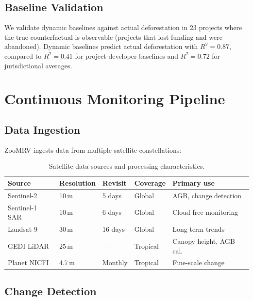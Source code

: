 \documentclass[11pt,a4paper]{article}
\begin{document}
\subsection{Baseline Validation}

We validate dynamic baselines against actual deforestation in 23
projects where the true counterfactual is observable (projects that
lost funding and were abandoned). Dynamic baselines predict actual
deforestation with $R^2 = 0.87$, compared to $R^2 = 0.41$ for
project-developer baselines and $R^2 = 0.72$ for jurisdictional
averages.


\section{Continuous Monitoring Pipeline}
\label{sec:monitoring}

\subsection{Data Ingestion}

ZooMRV ingests data from multiple satellite constellations:

\begin{table}[H]
\centering
\caption{Satellite data sources and processing characteristics.}
\label{tab:satellites}
\begin{tabular}{p{3cm}p{2cm}p{2cm}p{2cm}p{2.5cm}}
\toprule
\textbf{Source} & \textbf{Resolution} & \textbf{Revisit} &
  \textbf{Coverage} & \textbf{Primary use} \\
\midrule
Sentinel-2 & 10\,m & 5 days & Global & AGB, change detection \\
Sentinel-1 SAR & 10\,m & 6 days & Global & Cloud-free monitoring \\
Landsat-9 & 30\,m & 16 days & Global & Long-term trends \\
GEDI LiDAR & 25\,m & --- & Tropical & Canopy height, AGB cal. \\
Planet NICFI & 4.7\,m & Monthly & Tropical & Fine-scale change \\
\bottomrule
\end{tabular}
\end{table}

\subsection{Change Detection}
\end{document}
